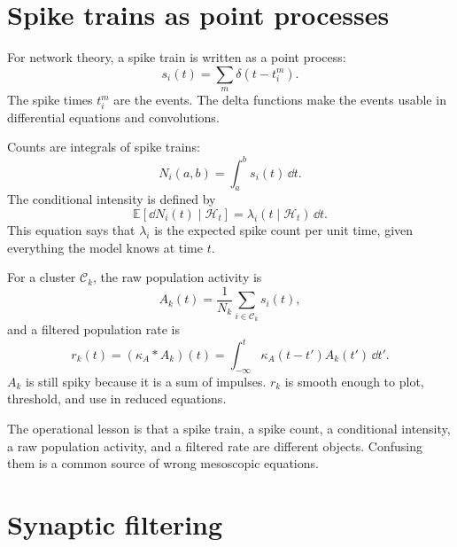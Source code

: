 \section{Spike trains as point processes}
\label{sec:spike-trains-point-processes-project}

For network theory, a spike train is written as a point process:
%
\begin{equation}
  s_i(t)
  =
  \sum_m\delta(t-t_i^m).
  \label{eq:project-spike-train}
\end{equation}
%
The spike times $t_i^m$ are the events. The delta functions make the events usable in differential equations and convolutions.

Counts are integrals of spike trains:
%
\begin{equation}
  N_i(a,b)
  =
  \int_a^b s_i(t)\,\dd t.
  \label{eq:spike-count-integral}
\end{equation}
%
The conditional intensity is defined by
%
\begin{equation}
  \mathbb{E}[\dd N_i(t)\mid\mathcal{H}_t]
  =
  \lambda_i(t\mid\mathcal{H}_t)\,\dd t .
  \label{eq:conditional-intensity-definition}
\end{equation}
%
This equation says that $\lambda_i$ is the expected spike count per unit time, given everything the model knows at time $t$.

For a cluster $\mathcal{C}_k$, the raw population activity is
%
\begin{equation}
  A_k(t)
  =
  \frac{1}{N_k}\sum_{i\in\mathcal{C}_k}s_i(t),
  \label{eq:raw-cluster-activity-ch03}
\end{equation}
%
and a filtered population rate is
%
\begin{equation}
  r_k(t)
  =
  (\kappa_A*A_k)(t)
  =
  \int_{-\infty}^{t}\kappa_A(t-t')A_k(t')\,\dd t' .
  \label{eq:filtered-cluster-rate-ch03}
\end{equation}
%
$A_k$ is still spiky because it is a sum of impulses. $r_k$ is smooth enough to plot, threshold, and use in reduced equations.

The operational lesson is that a spike train, a spike count, a conditional intensity, a raw population activity, and a filtered rate are different objects. Confusing them is a common source of wrong mesoscopic equations.

\section{Synaptic filtering}
\label{sec:synaptic-filtering-project}

